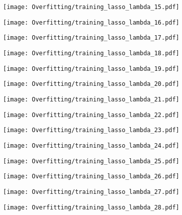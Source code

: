 \documentclass[xcolor=pdftex,dvipsnames,table]{beamer}
\begin{document}
\frame
{
	\begin{center}
		\texttt{[image: Overfitting/training\_lasso\_lambda\_15.pdf]}
	\end{center}
}
\frame
{
	\begin{center}
		\texttt{[image: Overfitting/training\_lasso\_lambda\_16.pdf]}
	\end{center}
}
\frame
{
	\begin{center}
		\texttt{[image: Overfitting/training\_lasso\_lambda\_17.pdf]}
	\end{center}
}
\frame
{
	\begin{center}
		\texttt{[image: Overfitting/training\_lasso\_lambda\_18.pdf]}
	\end{center}
}
\frame
{
	\begin{center}
		\texttt{[image: Overfitting/training\_lasso\_lambda\_19.pdf]}
	\end{center}
}
\frame
{
	\begin{center}
		\texttt{[image: Overfitting/training\_lasso\_lambda\_20.pdf]}
	\end{center}
}
\frame
{
	\begin{center}
		\texttt{[image: Overfitting/training\_lasso\_lambda\_21.pdf]}
	\end{center}
}
\frame
{
	\begin{center}
		\texttt{[image: Overfitting/training\_lasso\_lambda\_22.pdf]}
	\end{center}
}
\frame
{
	\begin{center}
		\texttt{[image: Overfitting/training\_lasso\_lambda\_23.pdf]}
	\end{center}
}
\frame
{
	\begin{center}
		\texttt{[image: Overfitting/training\_lasso\_lambda\_24.pdf]}
	\end{center}
}
\frame
{
	\begin{center}
		\texttt{[image: Overfitting/training\_lasso\_lambda\_25.pdf]}
	\end{center}
}
\frame
{
	\begin{center}
		\texttt{[image: Overfitting/training\_lasso\_lambda\_26.pdf]}
	\end{center}
}
\frame
{
	\begin{center}
		\texttt{[image: Overfitting/training\_lasso\_lambda\_27.pdf]}
	\end{center}
}
\frame
{
	\begin{center}
		\texttt{[image: Overfitting/training\_lasso\_lambda\_28.pdf]}
	\end{center}
}
\end{document}
